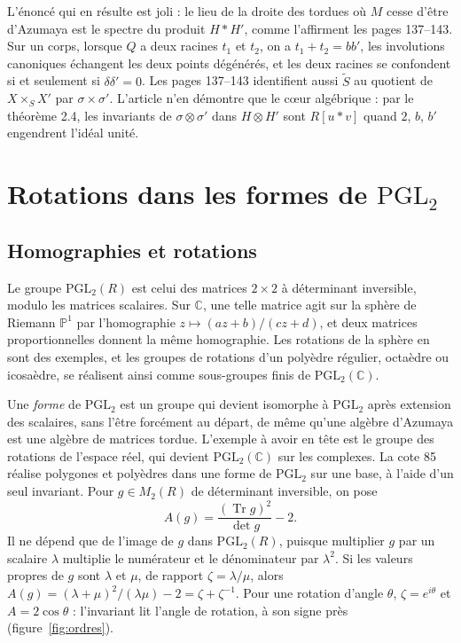 \documentclass[11pt,a4paper]{amsart}
\theoremstyle{definition}
\theoremstyle{plain}
\theoremstyle{remark}
\theoremstyle{plain}
\newcommand{\PP}{\mathbb P^1}
\newcommand{\PGL}{\mathrm{PGL}_2}
\newcommand{\Tr}{\operatorname{Tr}}
\begin{document}
L'énoncé qui en résulte est joli : le lieu de la droite des tordues où $M$ cesse d'être d'Azumaya est le spectre du produit $H * H'$, comme l'affirment les pages 137--143. Sur un corps, lorsque $Q$ a deux racines $t_1$ et $t_2$, on a $t_1 + t_2 = bb'$, les involutions canoniques échangent les deux points dégénérés, et les deux racines se confondent si et seulement si $\delta\delta' = 0$. Les pages 137--143 identifient aussi $\widetilde S$ au quotient de $X\times_S X'$ par $\sigma\times\sigma'$. L'article n'en démontre que le c\oe ur algébrique : par le théorème 2.4, les invariants de $\sigma\otimes\sigma'$ dans $H\otimes H'$ sont $R[u * v]$ quand $2$, $b$, $b'$ engendrent l'idéal unité.

\section{Rotations dans les formes de \texorpdfstring{$\mathrm{PGL}_2$}{PGL2}}

\subsection{Homographies et rotations}

Le groupe $\PGL(R)$ est celui des matrices $2\times 2$ à déterminant inversible, modulo les matrices scalaires. Sur $\mathbb C$, une telle matrice agit sur la sphère de Riemann $\PP$ par l'homographie $z \mapsto (az + b)/(cz + d)$, et deux matrices proportionnelles donnent la même homographie. Les rotations de la sphère en sont des exemples, et les groupes de rotations d'un polyèdre régulier, octaèdre ou icosaèdre, se réalisent ainsi comme sous-groupes finis de $\PGL(\mathbb C)$.

Une \emph{forme} de $\PGL$ est un groupe qui devient isomorphe à $\PGL$ après extension des scalaires, sans l'être forcément au départ, de même qu'une algèbre d'Azumaya est une algèbre de matrices tordue. L'exemple à avoir en tête est le groupe des rotations de l'espace réel, qui devient $\PGL(\mathbb C)$ sur les complexes. La cote 85 réalise polygones et polyèdres dans une forme de $\PGL$ sur une base, à l'aide d'un seul invariant. Pour $g \in M_2(R)$ de déterminant inversible, on pose
\[
A(g) = \frac{(\Tr g)^2}{\det g} - 2.
\]
Il ne dépend que de l'image de $g$ dans $\PGL(R)$, puisque multiplier $g$ par un scalaire $\lambda$ multiplie le numérateur et le dénominateur par $\lambda^2$. Si les valeurs propres de $g$ sont $\lambda$ et $\mu$, de rapport $\zeta = \lambda/\mu$, alors $A(g) = (\lambda + \mu)^2/(\lambda\mu) - 2 = \zeta + \zeta^{-1}$. Pour une rotation d'angle $\theta$, $\zeta = e^{i\theta}$ et $A = 2\cos\theta$ : l'invariant lit l'angle de rotation, à son signe près (figure~\ref{fig:ordres}).
\end{document}
